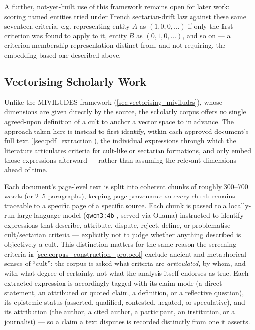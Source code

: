 A further, not-yet-built use of this framework remains open for later work: scoring named entities tried under French sectarian-drift law against these same seventeen criteria, e.g. representing entity $A$ as $(1,0,0,\ldots)$ if only the first criterion was found to apply to it, entity $B$ as $(0,1,0,\ldots)$, and so on — a criterion-membership representation distinct from, and not requiring, the embedding-based one described above.

\subsection{Vectorising Scholarly Work}\label{sec:vectorising_scholarly_work}
Unlike the MIVILUDES framework (\ref{sec:vectorising_miviludes}), whose dimensions are given directly by the source, the scholarly corpus offers no single agreed-upon definition of a cult to anchor a vector space to in advance. The approach taken here is instead to first identify, within each approved document's full text (\ref{sec:pdf_extraction}), the individual expressions through which the literature articulates criteria for cult-like or sectarian formations, and only embed those expressions afterward — rather than assuming the relevant dimensions ahead of time.

Each document's page-level text is split into coherent chunks of roughly 300--700 words (or 2--5 paragraphs), keeping page provenance so every chunk remains traceable to a specific page of a specific source. Each chunk is passed to a locally-run large language model (\texttt{qwen3:4b} \autocite{yangQwen3TechnicalReport2025}, served via Ollama) instructed to identify expressions that describe, attribute, dispute, reject, define, or problematise cult/sectarian criteria — explicitly not to judge whether anything described is objectively a cult. This distinction matters for the same reason the screening criteria in \ref{sec:corpus_construction_protocol} exclude ancient and metaphorical senses of \enquote{cult}: the corpus is asked what criteria are \textit{articulated}, by whom, and with what degree of certainty, not what the analysis itself endorses as true. Each extracted expression is accordingly tagged with its claim mode (a direct statement, an attributed or quoted claim, a definition, or a reflective question), its epistemic status (asserted, qualified, contested, negated, or speculative), and its attribution (the author, a cited author, a participant, an institution, or a journalist) — so a claim a text disputes is recorded distinctly from one it asserts.

